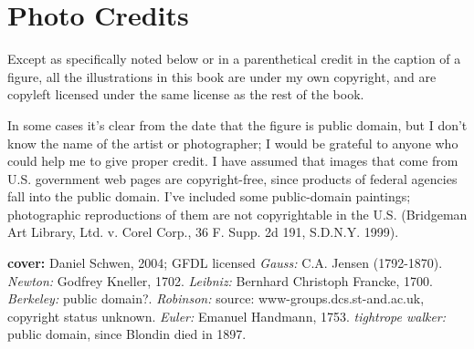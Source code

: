 \chapter{Photo Credits}

\footnotesize

Except as specifically noted below or in a parenthetical credit in the
caption of a figure, all the illustrations in this book are
under my own copyright, and are copyleft licensed under the same license
as the rest of the book. 

In some cases it's clear from the date that the
figure is public domain, but I don't know the name of the artist or photographer; I would
be grateful to anyone who could help me to give proper credit.
I have assumed that images
that come from U.S. government web pages are copyright-free, since products
of federal agencies fall into the public domain.
I've included some
public-domain paintings; photographic reproductions of them are not
copyrightable in the U.S. (Bridgeman Art Library, Ltd. v. Corel Corp.,
36 F. Supp. 2d 191, S.D.N.Y. 1999).

\begin{sloppypar}
\noindent

\newcommand{\photocredit}[1]{\footnotesize{(\textit{#1})}}%
\newcommand{\docred}[3]{\textbf{#1} \emph{#2:} #3.\quad}
\newcommand{\cred}[3]{\docred{\pageref{fig:#1}}{#2}{#3}}
\newcommand{\credtwo}[4]{\docred{\pageref{fig:#1},\pageref{fig:#2}}{#3}{#4}}
\newcommand{\credthree}[5]{\docred{\pageref{fig:#1},\pageref{fig:#2},\pageref{fig:#3}}{#4}{#5}}

\textbf{cover:} Daniel Schwen, 2004; GFDL licensed
\cred{gauss}{Gauss}{C.A. Jensen (1792-1870)}
\cred{newton}{Newton}{Godfrey Kneller, 1702}
\cred{leibniz}{Leibniz}{Bernhard Christoph Francke, 1700}
\cred{berkeley}{Berkeley}{public domain?}
\cred{robinson}{Robinson}{source: www-groups.dcs.st-and.ac.uk, copyright status unknown}
\cred{euler}{Euler}{Emanuel Handmann, 1753}
\cred{blondin}{tightrope walker}{public domain, since Blondin died in 1897}

\end{sloppypar}\normalsize

